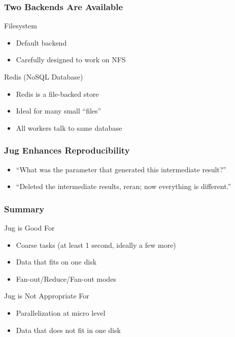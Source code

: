 \documentclass{beamer}
\begin{document}
\begin{frame}[fragile]
\frametitle{Two Backends Are Available}
\begin{block}{Filesystem}
\begin{itemize}
\item Default backend
\item Carefully designed to work on NFS
\end{itemize}
\end{block}

\begin{block}{Redis (NoSQL Database)}
\begin{itemize}
\item Redis is a file-backed store
\item Ideal for many small ``files''
\item All workers talk to same database
\end{itemize}
\end{block}

\end{frame}

\begin{frame}[fragile]
\frametitle{Jug Enhances Reproducibility}

\begin{itemize}
\item ``What was the parameter that generated this intermediate result?''
\item ``Deleted the intermediate results, reran; now everything is different.''
\end{itemize}

\end{frame}


\begin{frame}[fragile]
\frametitle{Summary}
\begin{block}{Jug is Good For}
\begin{itemize}
\item Coarse tasks (at least 1 second, ideally a few more)
\item Data that fits on one disk
\item Fan-out/Reduce/Fan-out modes
\end{itemize}
\end{block}

\begin{block}{Jug is Not Appropriate For}
\begin{itemize}
\item Parallelization at micro level
\item Data that does not fit in one disk
\end{itemize}
\end{block}
\end{frame}
\end{document}
